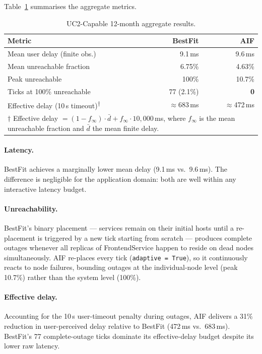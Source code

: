 \documentclass[11pt, a4paper]{article}
\begin{document}
Table~\ref{tab:main_results} summarises the aggregate metrics.

\begin{table}[ht]
\centering
\caption{UC2-Capable 12-month aggregate results.}
\label{tab:main_results}
\begin{tabular}{lrr}
\toprule
\textbf{Metric} & \textbf{BestFit} & \textbf{AIF} \\
\midrule
Mean user delay (finite obs.) & 9.1\,ms & 9.6\,ms \\
Mean unreachable fraction     & 6.75\%  & 4.63\%  \\
Peak unreachable              & 100\%   & 10.7\%  \\
Ticks at 100\% unreachable    & 77 (2.1\%) & \textbf{0} \\
\midrule
Effective delay (10\,s timeout)\textsuperscript{$\dagger$}
                              & $\approx$683\,ms & $\approx$472\,ms \\
\bottomrule
\multicolumn{3}{l}{\footnotesize
  $\dagger$ Effective delay $= (1-f_\infty)\cdot\bar{d} + f_\infty \cdot 10{,}000$\,ms,
  where $f_\infty$ is the mean unreachable fraction and $\bar{d}$ the mean
  finite delay.}
\end{tabular}
\end{table}

\paragraph{Latency.}
BestFit achieves a marginally lower mean delay (9.1\,ms vs.\ 9.6\,ms).
The difference is negligible for the application domain: both are well within
any interactive latency budget.

\paragraph{Unreachability.}
BestFit's binary placement --- services remain on their initial hosts until a
re-placement is triggered by a new tick starting from scratch --- produces
complete outages whenever all replicas of FrontendService happen to reside on
dead nodes simultaneously.
AIF re-places every tick (\texttt{adaptive = True}), so it continuously
reacts to node failures, bounding outages at the individual-node level
(peak 10.7\%) rather than the system level (100\%).

\paragraph{Effective delay.}
Accounting for the 10\,s user-timeout penalty during outages, AIF delivers a
31\% reduction in user-perceived delay relative to BestFit (472\,ms vs.\
683\,ms).
BestFit's 77 complete-outage ticks dominate its effective-delay budget despite
its lower raw latency.
\end{document}

